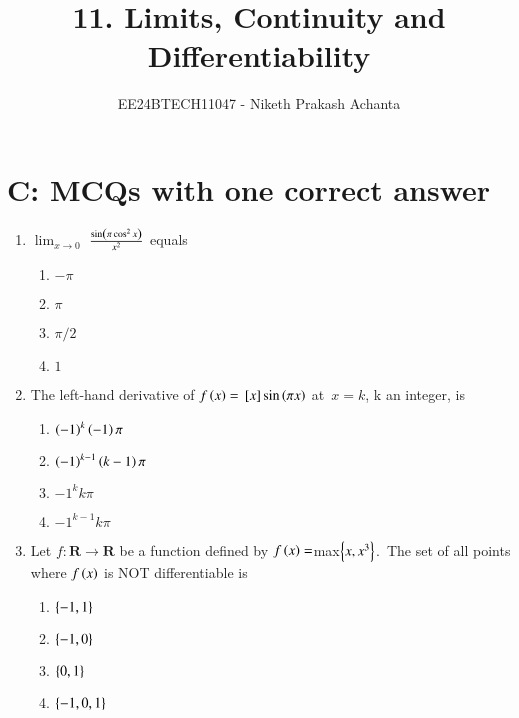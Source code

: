 \documentclass[journal,12pt,onecolumn]{IEEEtran}
\theoremstyle{remark}
\begin{document}

\vspace{3cm}

\title{11. Limits, Continuity and Differentiability}
\author{EE24BTECH11047 - Niketh Prakash Achanta}
\maketitle
\bigskip
\section{C: MCQs with one correct answer}

\renewcommand{\thefigure}{\theenumi}
\renewcommand{\thetable}{\theenumi}
\begin{enumerate}
\item %

	$\lim_{x\to0}$  $\frac{\sin\left(\pi \cos^2 x \right)}{x^2}$ \: equals \hfill{}
    \begin{enumerate}
     \item $-\pi$
     \item $\pi$
     \item $\pi/2$
     \item $1$\\
     \end{enumerate}

\item %
	The left-hand derivative of $f\left(x\right)={}\left[x\right]\sin\left(\pi x\right)$ at\ $x=k$, k an integer, is \hfill{}
    \begin{enumerate}
	    \item $\left(-1\right)^k \left(-1\right) \pi$
	    \item $\left(-1\right)^{k-1}\left(k-1\right) \pi$
            \item $-1^k k\pi$
     	    \item $-1^{k-1} k\pi$\\
    \end{enumerate}

\item %

	Let $f:\mathbf{R}\rightarrow\mathbf{R}$ be a function defined by $f\left(x\right)=$max$\left\{x,x^3\right\}$.\ The set of all points where $f\left(x\right)$ is NOT differentiable is \hfill{}
    \begin{enumerate}
     \item $\left\{-1,1\right\}$
     \item $\left\{-1,0\right\}$
     \item $\left\{0,1\right\}$
     \item $\left\{-1,0,1\right\}$\\
    \end{enumerate}



\end{enumerate}
\end{document}
